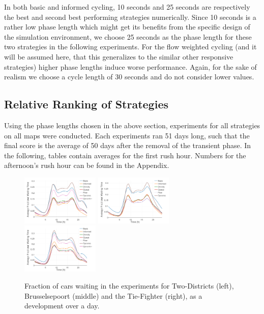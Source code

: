 \documentclass[11pt]{article}
\begin{document}
In both basic and informed cycling, 10 seconds and 25 seconds are respectively the best and second best performing strategies numerically. Since 10 seconds is a rather low phase length which might get its benefits from the specific design of the simulation environment, we choose 25 seconds as the phase length for these two strategies in the following experiments. For the flow weighted cycling (and it will be assumed here, that this generalizes to the similar other responsive strategies) higher phase lengths induce worse performance. Again, for the sake of realism we choose a cycle length of 30 seconds and do not consider lower values.

\subsection{Relative Ranking of Strategies}
Using the phase lengths chosen in the above section, experiments for all strategies on all maps were conducted. Each experiments ran 51 days long, such that the final score is the average of 50 days after the removal of the transient phase. In the following, tables contain averages for the first rush hour. Numbers for the afternoon's rush hour can be found in the Appendix.

\begin{figure}[t]
	\includegraphics[width=0.33\textwidth]{img/frac_time_waiting_twodistr.png}
	\includegraphics[width=0.33\textwidth]{img/frac_time_waiting_maas.png}
	\includegraphics[width=0.33\textwidth]{img/frac_time_waiting_tie.png}
	\caption{Fraction of cars waiting in the experiments for Two-Districts (left), Brusselsepoort (middle) and the Tie-Fighter (right), as a development over a day. \label{fig:frac-waits-line}}
\end{figure}
\end{document}

